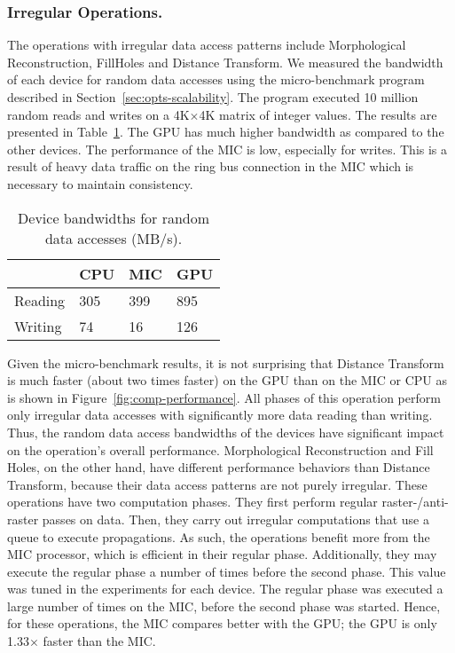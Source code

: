 \subsubsection{{\bf Irregular Operations.}}
The operations with irregular data access patterns include
Morphological Reconstruction, FillHoles and Distance Transform. We measured 
the bandwidth of each device for random data accesses using the micro-benchmark 
program described in Section~\ref{sec:opts-scalability}. The program executed 
10 million random reads and writes on a 4K$\times$4K matrix of integer 
values. 
The results are presented in Table~\ref{tab:random-bandwidth}. The GPU has 
much higher bandwidth as compared to the other devices. The performance of 
the MIC is low, especially for writes. This is a result of heavy data traffic 
on the ring bus connection in the MIC which is necessary to maintain
consistency. 
\begin{table}[h!]
\caption{Device bandwidths for random data accesses (MB/s).}
\vspace*{-2ex}
\begin{center}
\begin{tabular}{l l l l}
\hline
   	& CPU	& MIC	&	GPU 	\\ \hline \hline
Reading	& 305	& 399	&	895	\\ \hline
Writing	& 74	& 16	&     	126	\\ \hline
\end{tabular}
\end{center}
\label{tab:random-bandwidth}
\vspace*{-2ex}
\end{table}

Given the micro-benchmark results, it is not surprising that 
Distance Transform is much faster (about two times faster)
on the GPU than on the MIC or CPU as is shown in 
Figure~\ref{fig:comp-performance}. All phases of this operation perform only
irregular data accesses with significantly more data reading than writing. Thus, 
the random data access bandwidths of the devices have significant impact on 
the operation's overall performance.
Morphological Reconstruction and Fill Holes, on the other hand, have different 
performance behaviors than Distance Transform, because their data access 
patterns are not purely irregular. These operations have two computation 
phases. They first perform regular raster-/anti-raster passes on data. Then, 
they carry out irregular computations that use a queue to execute propagations. 
As such, the operations benefit more from the MIC processor, which is efficient in their
regular phase. Additionally, they may execute the regular phase a
number of times before the second phase. This value was tuned in the experiments 
for each device. The regular phase was 
executed a large number of times on the MIC, before the second phase was started. 
Hence, for these operations, the MIC compares better with the GPU; the GPU is
only 1.33$\times$ faster than the MIC.
